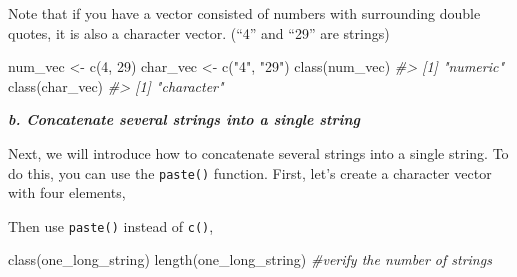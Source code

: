 \documentclass[
]{book}
\newenvironment{Shaded}{\begin{snugshade}}{\end{snugshade}}
\newcommand{\CommentTok}[1]{\textcolor[rgb]{0.56,0.35,0.01}{\textit{#1}}}
\newcommand{\DecValTok}[1]{\textcolor[rgb]{0.00,0.00,0.81}{#1}}
\newcommand{\FunctionTok}[1]{\textcolor[rgb]{0.00,0.00,0.00}{#1}}
\newcommand{\NormalTok}[1]{#1}
\newcommand{\OtherTok}[1]{\textcolor[rgb]{0.56,0.35,0.01}{#1}}
\newcommand{\StringTok}[1]{\textcolor[rgb]{0.31,0.60,0.02}{#1}}
\begin{document}
Note that if you have a vector consisted of numbers with surrounding double quotes, it is also a character vector. (``4'' and ``29'' are strings)

\begin{Shaded}
\begin{Highlighting}[]
\NormalTok{num\_vec }\OtherTok{\textless{}{-}} \FunctionTok{c}\NormalTok{(}\DecValTok{4}\NormalTok{, }\DecValTok{29}\NormalTok{)}
\NormalTok{char\_vec }\OtherTok{\textless{}{-}} \FunctionTok{c}\NormalTok{(}\StringTok{"4"}\NormalTok{, }\StringTok{"29"}\NormalTok{) }
\FunctionTok{class}\NormalTok{(num\_vec)}
\CommentTok{\#\textgreater{} [1] "numeric"}
\FunctionTok{class}\NormalTok{(char\_vec)}
\CommentTok{\#\textgreater{} [1] "character"}
\end{Highlighting}
\end{Shaded}

\textbf{\emph{b. Concatenate several strings into a single string}}

Next, we will introduce how to concatenate several strings into a single string. To do this, you can use the \texttt{paste()} function. First, let's create a character vector with four elements,

\begin{Shaded}
\end{Shaded}

Then use \texttt{paste()} instead of \texttt{c()},

\begin{Shaded}
\end{Shaded}

\begin{Shaded}
\begin{Highlighting}[]
\FunctionTok{class}\NormalTok{(one\_long\_string)}
\FunctionTok{length}\NormalTok{(one\_long\_string) }\CommentTok{\#verify the number of strings}
\end{Highlighting}
\end{Shaded}
\end{document}
